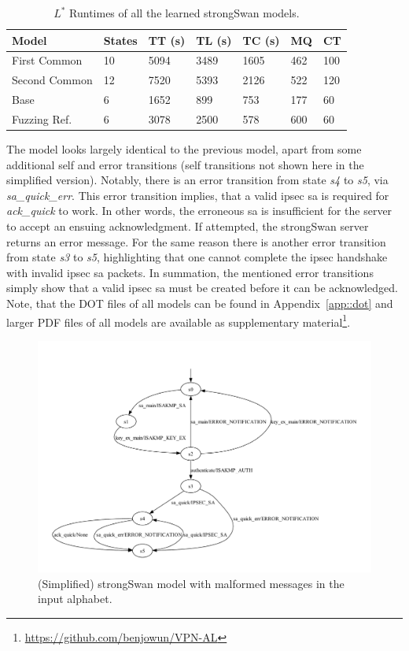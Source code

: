 \begin{table}[h]
	\centering
	\begin{tabular}{|l|l|l|l|l|l|l|}
		\hline
		\rowcolor[HTML]{C0C0C0} 
		Model     & States & TT (s)   & TL (s)   & TC (s)   & MQ  & CT  \\ \hline
		First Common  & 10     & 5094 & 3489 & 1605 & 462 & 100 \\ \hline
		Second Common  & 12     & 7520 & 5393 & 2126 & 522 & 120 \\ \hline
		Base      & 6      & 1652 & 899  & 753  & 177 & 60  \\ \hline
		Fuzzing Ref. & 6      & 3078 & 2500 & 578  & 600 & 60  \\ \hline
	\end{tabular}
	\caption{$L^*$ Runtimes of all the learned strongSwan models.}
	\label{tab:runtime_summary_lstar}
\end{table}

The model looks largely identical to the previous model, apart from some additional self and error transitions (self transitions not shown here in the simplified version). Notably, there is an error transition from state \emph{s4} to \emph{s5}, via \emph{sa\_quick\_err}. This error transition implies, that a valid \ac{ipsec} \ac{sa} is required for \emph{ack\_quick} to work. In other words, the erroneous \ac{sa} is insufficient for the server to accept an ensuing acknowledgment. If attempted, the strongSwan server returns an error message. For the same reason there is another error transition from state \emph{s3} to \emph{s5}, highlighting that one cannot complete the \ac{ipsec} handshake with invalid \ac{ipsec} \ac{sa} packets. In summation, the mentioned error transitions simply show that a valid \ac{ipsec} \ac{sa} must be created before it can be acknowledged. Note, that the DOT files of all models can be found in Appendix~\ref{app::dot} and larger PDF files of all models are available as supplementary material\footnote{\url{https://github.com/benjowun/VPN-AL}}.

\begin{figure}
	\centering
	\includegraphics[width=\linewidth]{images/models/strongSwanErrKV}
	\caption{(Simplified) strongSwan model with malformed messages in the input alphabet.}
	\label{fig:withfilterwitherrors}
\end{figure}


